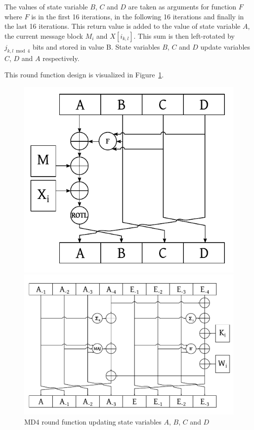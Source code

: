 \begin{description}
    The values of state variable $B$, $C$ and $D$ are taken as arguments
    for function $F$ where $F$ is  in the first 16 iterations,
     in the following 16 iterations and finally 
    in the last 16 iterations. This return value is added to the value of state
    variable $A$, the current message block $M_i$ and $X[i_{k,l}]$. This sum is then left-rotated by
    $j_{k,l \bmod{4}}$ bits and stored in value B. State variables $B$, $C$ and
    $D$ update variables $C$, $D$ and $A$ respectively.

    This round function design is visualized in Figure~\ref{fig:md4-round-function}.
\end{description}

\begin{figure}[p]
  \begin{center}
    \includegraphics{img/md4.pdf}
    \caption{MD4 round function updating state variables $A$, $B$, $C$ and $D$}
    \label{fig:md4-round-function}
  \end{center}
  \begin{center}
    \includegraphics[width=\textwidth]{img/sha256.pdf}

\end{center}
\end{figure}
